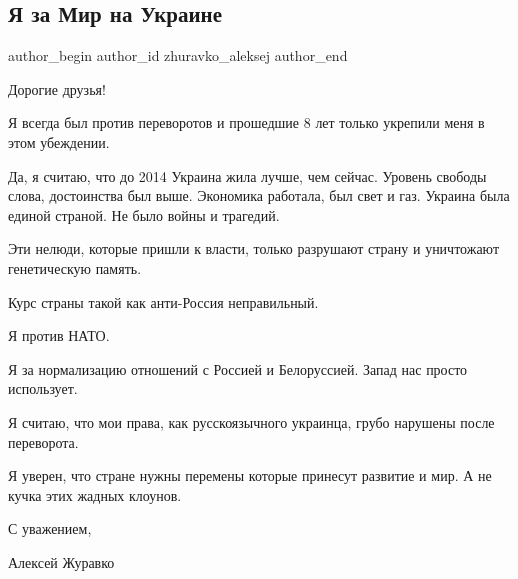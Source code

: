  
 
 
 
 
 
\subsection{Я за Мир на Украине}
\label{sec:01_12_2021.fb.zhuravko_aleksej.1.ja_za_mir_na_ukraine}
 
\ifcmt
 author_begin
   author_id zhuravko_aleksej
 author_end
\fi

Дорогие друзья! 

Я всегда был против переворотов и прошедшие 8 лет только укрепили меня в этом
убеждении.


Да, я считаю, что до 2014 Украина жила лучше, чем сейчас. Уровень свободы
слова, достоинства был выше. Экономика работала, был свет и газ. Украина была
единой страной. Не было войны и трагедий. 

Эти нелюди, которые пришли к власти, только разрушают страну и уничтожают
генетическую память. 

Курс страны такой как анти-Россия неправильный. 

Я против НАТО.

Я за нормализацию отношений с Россией и Белоруссией. Запад нас просто
использует.

Я считаю, что мои права, как русскоязычного украинца, грубо нарушены после
переворота. 

Я уверен, что стране нужны перемены которые принесут развитие и мир.  А не
кучка этих жадных клоунов. 

С уважением, 

Алексей Журавко
